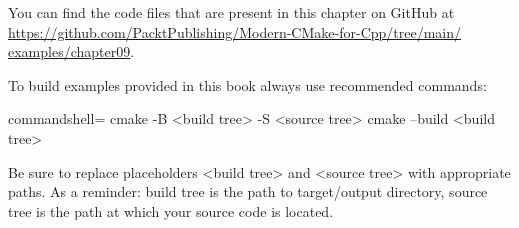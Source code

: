 You can find the code files that are present in this chapter on GitHub at \url{https://github.com/PacktPublishing/Modern-CMake-for-Cpp/tree/main/ examples/chapter09}.

To build examples provided in this book always use recommended commands:

\begin{tcblisting}{commandshell={}}
cmake -B <build tree> -S <source tree>
cmake --build <build tree>
\end{tcblisting}

Be sure to replace placeholders <build tree> and <source tree> with appropriate paths. As a reminder: build tree is the path to target/output directory, source tree is the path at which your source code is located.
